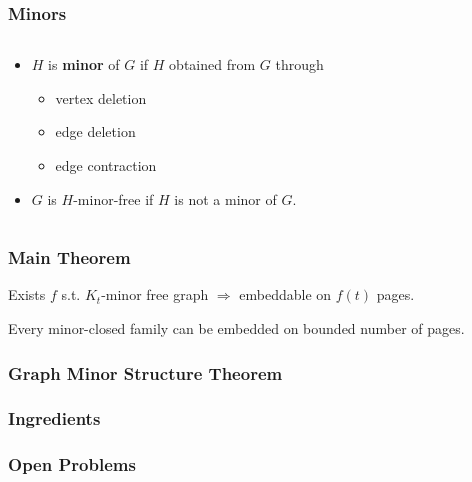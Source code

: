 \documentclass{beamer}
\begin{document}
\begin{frame}
    \frametitle{Minors}
    \begin{columns}
      \begin{column}{0.5\textwidth}
          \begin{itemize}
            \item $H$ is \textbf{minor} of $G$ if $H$ obtained from $G$ through \begin{itemize}
              \item vertex deletion
              \item edge deletion
              \item edge contraction
            \end{itemize}
            \item $G$ is $H$-minor-free if $H$ is not a minor of $G$. 
          \end{itemize}    
      \end{column}
        \begin{column}{0.5\textwidth}
          \begin{figure}
            \centering
            
          \end{figure}
      \end{column}
    \end{columns}
\end{frame}

\begin{frame}
  \frametitle{Main Theorem}
  \begin{theorem}
  Exists $f$ s.t. $K_t$-minor free graph $ \Rightarrow$ embeddable on $f(t)$ pages.
  \end{theorem}
  \begin{corollary}
    Every minor-closed family can be embedded on bounded number of pages.
  \end{corollary}

\end{frame}

\begin{frame}
    \frametitle{Graph Minor Structure Theorem}
\end{frame}

\begin{frame}
  \frametitle{Ingredients}
\end{frame}

\begin{frame}
  \frametitle{Open Problems}
\end{frame}
\end{document}
